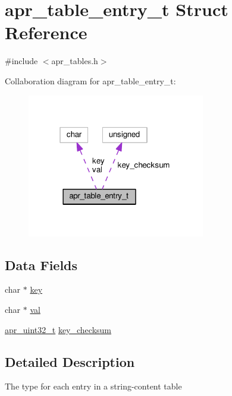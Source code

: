 \hypertarget{structapr__table__entry__t}{}\section{apr\+\_\+table\+\_\+entry\+\_\+t Struct Reference}
\label{structapr__table__entry__t}


{\ttfamily \#include $<$apr\+\_\+tables.\+h$>$}



Collaboration diagram for apr\+\_\+table\+\_\+entry\+\_\+t\+:
\nopagebreak
\begin{figure}[H]
\begin{center}
\leavevmode
\includegraphics[width=220pt]{structapr__table__entry__t__coll__graph}
\end{center}
\end{figure}
\subsection*{Data Fields}
\begin{DoxyCompactItemize}
\item 
char $\ast$ \hyperlink{structapr__table__entry__t_abdccb35ea49dd95082fdce65a5a6001f}{key}
\item 
char $\ast$ \hyperlink{structapr__table__entry__t_a755371d0aa6a9487b502c34807271e6f}{val}
\item 
\hyperlink{group__apr__platform_ga558548a135d8a816c4787250744ea147}{apr\+\_\+uint32\+\_\+t} \hyperlink{structapr__table__entry__t_a0c51574420b6cc7bc6c2e35710e0ad3a}{key\+\_\+checksum}
\end{DoxyCompactItemize}


\subsection{Detailed Description}
The type for each entry in a string-\/content table 

